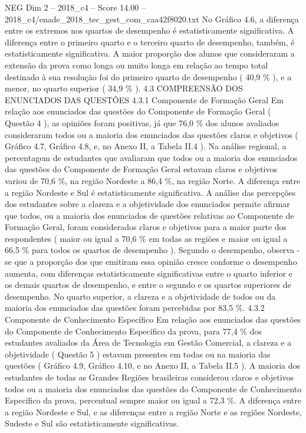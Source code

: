 \begin{textsample}{NEG Dim 2 – 2018\_c4 – Score 14.00 – 2018\_c4/enade\_2018\_tec\_gest\_com\_caa42f8020.txt}
No Gráfico 4.6, a diferença entre os extremos nos quartos de desempenho é estatisticamente significativa.
A diferença entre o primeiro quarto e o terceiro quarto de desempenho, também, é estatisticamente significativa.
A maior proporção dos alunos que consideraram a extensão da prova como longa ou muito longa em relação ao tempo total destinado à sua resolução foi do primeiro quarto de desempenho ( 40,9 \% ), e a menor, no quarto superior ( 34,9 \% ). 4.3 COMPREENSÃO DOS ENUNCIADOS DAS QUESTÕES 4.3.1 Componente de Formação Geral Em relação aos enunciados das questões do Componente de Formação Geral ( Questão 4 ), as opiniões foram positivas, já que 76,0 \% dos alunos avaliados consideraram todos ou a maioria dos enunciados das questões claros e objetivos ( Gráfico 4.7, Gráfico 4.8, e, no Anexo II, a Tabela II.4 ).
Na análise regional, a percentagem de estudantes que avaliaram que todos ou a maioria dos enunciados das questões do Componente de Formação Geral estavam claros e objetivos variou de 70,6 \%, na região Nordeste a 86,4 \%, na região Norte.
A diferença entre a região Nordeste e Sul é estatisticamente significativa.
A análise das percepções dos estudantes sobre a clareza e a objetividade dos enunciados permite afirmar que todos, ou a maioria dos enunciados de questões relativas ao Componente de Formação Geral, foram considerados claros e objetivos para a maior parte dos respondentes ( maior ou igual a 70,6 \% em todas as regiões e maior ou igual a 66,5 \% para todos os quartos de desempenho ).
Segundo o desempenho, observa -se que a proporção dos que emitiram essa opinião cresce conforme o desempenho aumenta, com diferenças estatisticamente significativas entre o quarto inferior e os demais quartos de desempenho, e entre o segundo e os quartos superiores de desempenho.
No quarto superior, a clareza e a objetividade de todos ou da maioria dos enunciados das questões foram percebidas por 83,5 \%. 4.3.2 Componente de Conhecimento Específico Em relação aos enunciados das questões do Componente de Conhecimento Específico da prova, para 77,4 \% dos estudantes avaliados da Área de Tecnologia em Gestão Comercial, a clareza e a objetividade ( Questão 5 ) estavam presentes em todas ou na maioria das questões ( Gráfico 4.9, Gráfico 4.10, e no Anexo II, a Tabela II.5 ).
A maioria dos estudantes de todas as Grandes Regiões brasileiras considerou claros e objetivos todos ou a maioria dos enunciados das questões do Componente de Conhecimento Específico da prova, percentual sempre maior ou igual a 72,3 \%.
A diferença entre a região Nordeste e Sul, e as diferenças entre a região Norte e as regiões Nordeste, Sudeste e Sul são estatisticamente significativas.

\end{textsample}
